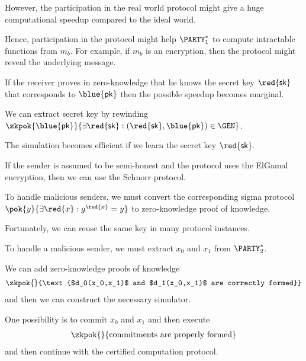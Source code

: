 \documentclass[landscape,dvips,footrule]{foils}
\renewcommand{\SK}{{\red{\mathsf{sk}}}}
\renewcommand{\PK}{{\blue{\mathsf{pk}}}}
\begin{document}
However, the participation in the real world protocol might give a
huge computational speedup compared to the ideal world. 

Hence, participation in the protocol might help $\PARTY_1^*$ to
compute intractable functions from $m_b$. For example, if $m_b$ is an
encryption, then the protocol might reveal the underlying message.



If the receiver proves in zero-knowledge that he knows the secret key
$\SK$ that corresponds to $\PK$ then the possible speedup becomes
marginal.
\begin{triangles}
  \item We can extract secret key by rewinding $\zkpok{\PK}{\exists \SK: (\SK,\PK)\in\GEN}$.
  \item The simulation  becomes efficient if we learn the secret key $\SK$.
\end{triangles}
\vspace*{1cm} 

If the sender is assumed to be semi-honest and the protocol uses the
ElGamal encryption, then  we can use the Schnorr  protocol.


To handle malicious senders, we must convert the corresponding sigma
protocol $\pok{y}{\exists \red{x}: g^{\red{x}}=y}$ to zero-knowledge proof of knowledge.\vspace*{2ex}

\centerline{}\vspace*{1ex}

Fortunately, we can reuse the same key in many protocol instances.\vspace*{-2ex}



To handle a malicious sender, we must extract $x_0$ and $x_1$ from
$\PARTY_2^*$.
\begin{triangles}
  \item We can add zero-knowledge proofs of knowledge
    \begin{align*}
      \zkpok{}{\text{$d_0(x_0,x_1)$ and $d_1(x_0,x_1)$ are correctly formed}}
    \end{align*}
   and then we can construct the necessary simulator.
  \item One possibility is to commit $x_0$ and $x_1$ and then execute
    \begin{align*}
      \zkpok{}{\text{commitments are properly formed}}
    \end{align*}
    and then continue with the certified computation protocol.
\end{triangles}\vspace*{3ex}
\end{document}
